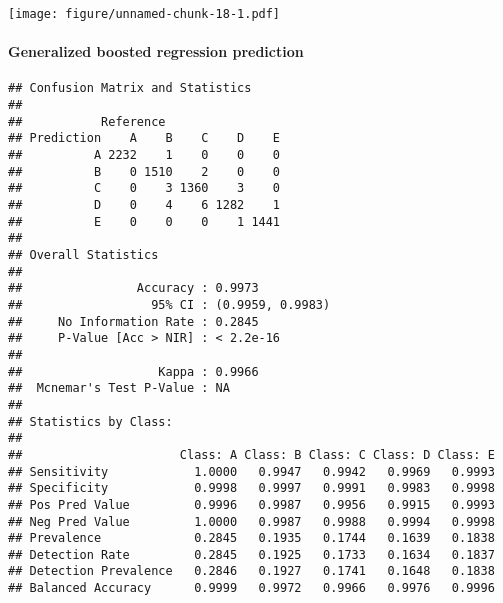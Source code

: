\documentclass[]{article}
\newenvironment{Shaded}{\begin{snugshade}}{\end{snugshade}}
\newcommand{\KeywordTok}[1]{\textcolor[rgb]{0.13,0.29,0.53}{\textbf{{#1}}}}
\newcommand{\DataTypeTok}[1]{\textcolor[rgb]{0.13,0.29,0.53}{{#1}}}
\newcommand{\DecValTok}[1]{\textcolor[rgb]{0.00,0.00,0.81}{{#1}}}
\newcommand{\StringTok}[1]{\textcolor[rgb]{0.31,0.60,0.02}{{#1}}}
\newcommand{\OtherTok}[1]{\textcolor[rgb]{0.56,0.35,0.01}{{#1}}}
\newcommand{\NormalTok}[1]{{#1}}
\begin{document}
\texttt{[image: figure/unnamed-chunk-18-1.pdf]}

\paragraph{Generalized boosted regression
prediction}\label{generalized-boosted-regression-prediction}

\begin{Shaded}
\end{Shaded}

\begin{verbatim}
## Confusion Matrix and Statistics
## 
##           Reference
## Prediction    A    B    C    D    E
##          A 2232    1    0    0    0
##          B    0 1510    2    0    0
##          C    0    3 1360    3    0
##          D    0    4    6 1282    1
##          E    0    0    0    1 1441
## 
## Overall Statistics
##                                           
##                Accuracy : 0.9973          
##                  95% CI : (0.9959, 0.9983)
##     No Information Rate : 0.2845          
##     P-Value [Acc > NIR] : < 2.2e-16       
##                                           
##                   Kappa : 0.9966          
##  Mcnemar's Test P-Value : NA              
## 
## Statistics by Class:
## 
##                      Class: A Class: B Class: C Class: D Class: E
## Sensitivity            1.0000   0.9947   0.9942   0.9969   0.9993
## Specificity            0.9998   0.9997   0.9991   0.9983   0.9998
## Pos Pred Value         0.9996   0.9987   0.9956   0.9915   0.9993
## Neg Pred Value         1.0000   0.9987   0.9988   0.9994   0.9998
## Prevalence             0.2845   0.1935   0.1744   0.1639   0.1838
## Detection Rate         0.2845   0.1925   0.1733   0.1634   0.1837
## Detection Prevalence   0.2846   0.1927   0.1741   0.1648   0.1838
## Balanced Accuracy      0.9999   0.9972   0.9966   0.9976   0.9996
\end{verbatim}
\end{document}
